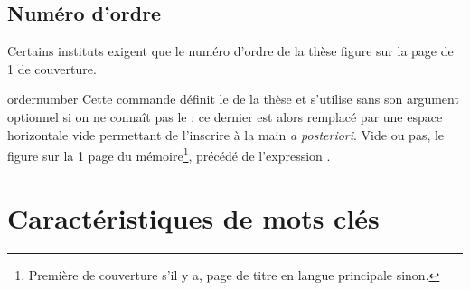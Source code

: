\subsection{Numéro d'ordre}
\label{sec-numero-dordre}

Certains instituts exigent que le numéro d'ordre de la thèse figure sur la page
de 1\iere{} de couverture.

\begin{docCommand}{ordernumber}{}
  Cette commande définit le  de la thèse et s'utilise sans
  son argument optionnel si on ne connaît pas  le  : ce dernier est alors remplacé par une espace horizontale vide
  permettant de l'inscrire à la main \emph{a posteriori}. Vide ou pas, le
   figure sur  la 1\iere{} page du
  mémoire\footnote{Première de couverture s'il y a, page de titre en langue
    principale sinon.}, précédé de l'expression
  .
\end{docCommand}

\section{Caractéristiques de mots clés}
\label{sec-proprietes-de-mots}

